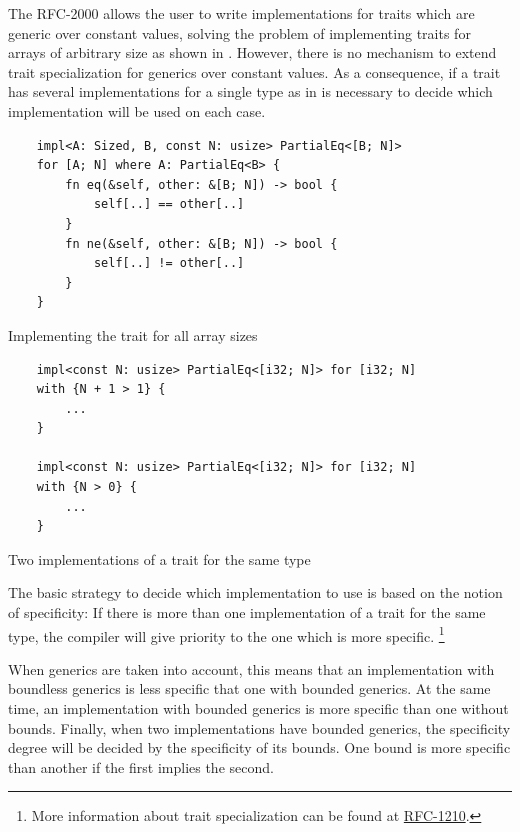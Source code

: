 The RFC-2000 allows the user to write implementations for traits which are
generic over constant values, solving the problem of implementing traits for
arrays of arbitrary size as shown in . However,
there is no mechanism to extend trait specialization for generics over constant
values. As a consequence, if a trait has several implementations for a single
type as in  is necessary to decide which
implementation will be used on each case. 

\begin{listing}[h]
	\begin{verbatim}
    impl<A: Sized, B, const N: usize> PartialEq<[B; N]> 
    for [A; N] where A: PartialEq<B> {
        fn eq(&self, other: &[B; N]) -> bool {
            self[..] == other[..]
        }
        fn ne(&self, other: &[B; N]) -> bool {
            self[..] != other[..]
        }
    }
	\end{verbatim}
    \caption{Implementing the  trait for all array sizes}
  \label{lst:trait_const_generics}
\end{listing}

\begin{listing}[h]
	\begin{verbatim}
    impl<const N: usize> PartialEq<[i32; N]> for [i32; N]
    with {N + 1 > 1} {
        ...
    }
   
    impl<const N: usize> PartialEq<[i32; N]> for [i32; N]
    with {N > 0} {
        ...
    }
	\end{verbatim}
    \caption{Two implementations of a trait for the same type}
  \label{lst:trait_const_generics_spec}
\end{listing}

The basic strategy to decide which implementation to use is based on the notion
of specificity: If there is more than one implementation of a trait for the
same type, the compiler will give priority to the one which is more specific.
\footnote{More information about trait specialization can be found at
\href{https://github.com/rust-lang/rfcs/blob/master/text/1210-impl-specialization.md}{RFC-1210}.}

When generics are taken into account, this means that an implementation with
boundless generics is less specific that one with bounded generics. At the same
time, an implementation with bounded generics is more specific than one without
bounds. Finally, when two implementations have bounded generics, the
specificity degree will be decided by the specificity of its bounds. One bound
is more specific than another if the first implies the second.

